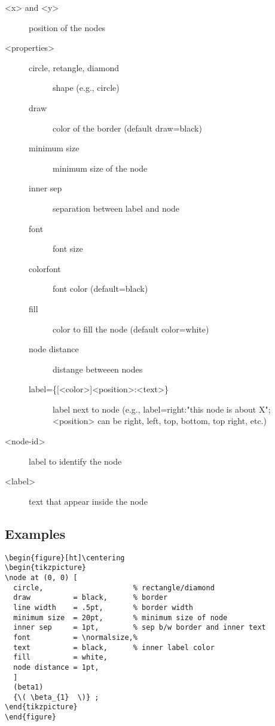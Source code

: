 \documentclass[a4paper]{article}
\begin{document}
\begin{description}
\item[{\color{red} <x> \color{black} and \color{red} <y> \color{black}}] position of the nodes
\item[{\color{red} <properties> \color{black}}] \begin{description}
\item[{circle, retangle, diamond}] shape (e.g., circle)
\item[{draw         }] color of the border (default draw=black)
\item[{minimum size }] minimum size of the node
\item[{inner sep    }] separation between label and node
\item[{font         }] font size
\item[{colorfont    }] font color (default=black)
\item[{fill         }] color to fill the node (default color=white)
\item[{node distance}] distange betweeen nodes
\item[{label=\{[<color>]<position>:\normalsize<text>\}        }] label next to node (e.g., label=right:"this node is about X"; <position> can be right, left, top, bottom, top right, etc.)
\end{description}
\item[{\color{red} <node-id> \color{black}}] label to identify the node
\item[{\color{red} <label> \color{black}}] text that appear inside the node
\end{description}

\subsection{Examples}
\label{sec:org6a235e1}
\lstset{numbers=left,language=[LaTeX]TeX,label= ,caption= ,captionpos=b}
\begin{lstlisting}
\begin{figure}[ht]\centering
\begin{tikzpicture}
\node at (0, 0) [
  circle,                     % rectangle/diamond
  draw          = black,      % border
  line width    = .5pt,       % border width
  minimum size  = 20pt,       % minimum size of node
  inner sep     = 1pt,        % sep b/w border and inner text
  font          = \normalsize,%
  text          = black,      % inner label color
  fill          = white,
  node distance = 1pt,
  ]
  (beta1)
  {\( \beta_{1}  \)} ;
\end{tikzpicture}
\end{figure}
\end{lstlisting}
\end{document}

